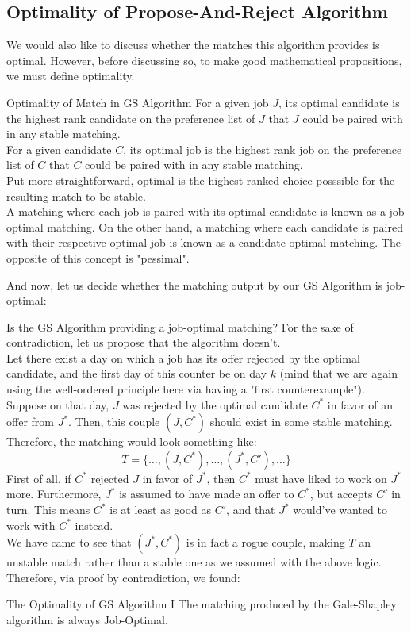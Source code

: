 \subsection{Optimality of Propose-And-Reject Algorithm}
We would also like to discuss whether the matches this algorithm provides is optimal. However, before discussing so, to make good mathematical propositions, we must define optimality.
\begin{ln-define}{Optimality of Match in GS Algorithm}{}
    For a given job $J$, its optimal candidate is the highest rank candidate on the preference list of $J$ that $J$ could be paired with in any stable matching. \\
    For a given candidate $C$, its optimal job is the highest rank job on the preference list of $C$ that $C$ could be paired with in any stable matching. \\
    Put more straightforward, optimal is the highest ranked choice posssible for the resulting match to be stable. \\
    A matching where each job is paired with its optimal candidate is known as a job optimal matching. On the other hand, a matching where each candidate is paired with their respective optimal job is known as a candidate optimal matching.
    The opposite of this concept is "pessimal".
\end{ln-define}
And now, let us decide whether the matching output by our GS Algorithm is job-optimal:
\begin{ln-think}{Is the GS Algorithm providing a job-optimal matching?}{}
    For the sake of contradiction, let us propose that the algorithm doesn't. \\
    Let there exist a day on which a job has its offer rejected by the optimal candidate, and the first day of this counter be on day $k$ (mind that we are again using the well-ordered principle here via having a "first counterexample"). \\
    Suppose on that day, $J$ was rejected by the optimal candidate $C^*$ in favor of an offer from $J^*$. Then, this couple $(J, C^*)$ should exist in some stable matching. Therefore, the matching would look something like:
    \[T = \{\dots, (J, C^*), \dots, (J^*, C'), \dots\}\]
    First of all, if $C^*$ rejected $J$ in favor of $J^*$, then $C^*$ must have liked to work on $J^*$ more. Furthermore, $J^*$ is assumed to have made an offer to $C^*$, but accepts $C'$ in turn. This means $C^*$ is at least as good as $C'$, and that $J^*$ would've wanted to work with $C^*$ instead. \\
    We have came to see that $(J^*, C^*)$ is in fact a rogue couple, making $T$ an unstable match rather than a stable one as we assumed with the above logic. \\
    Therefore, via proof by contradiction, we found:
    \begin{ln-theorem}{The Optimality of GS Algorithm I}{}
        The matching produced by the Gale-Shapley algorithm is always Job-Optimal.
    \end{ln-theorem}
\end{ln-think}
